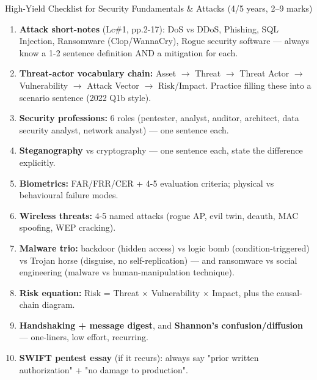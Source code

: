 \documentclass[12pt,a4paper]{article}
\begin{document}
\begin{keybox}{High-Yield Checklist for Security Fundamentals \& Attacks (4/5 years, 2--9 marks)}
\begin{enumerate}[noitemsep]
  \item \textbf{Attack short-notes} (Lc\#1, pp.2-17): DoS vs DDoS, Phishing, SQL Injection, Ransomware (Clop/WannaCry), Rogue security software --- always know a 1-2 sentence definition AND a mitigation for each.
  \item \textbf{Threat-actor vocabulary chain:} Asset $\to$ Threat $\to$ Threat Actor $\to$ Vulnerability $\to$ Attack Vector $\to$ Risk/Impact. Practice filling these into a scenario sentence (2022 Q1b style).
  \item \textbf{Security professions:} 6 roles (pentester, analyst, auditor, architect, data security analyst, network analyst) --- one sentence each.
  \item \textbf{Steganography} vs cryptography --- one sentence each, state the difference explicitly.
  \item \textbf{Biometrics:} FAR/FRR/CER + 4-5 evaluation criteria; physical vs behavioural failure modes.
  \item \textbf{Wireless threats:} 4-5 named attacks (rogue AP, evil twin, deauth, MAC spoofing, WEP cracking).
  \item \textbf{Malware trio:} backdoor (hidden access) vs logic bomb (condition-triggered) vs Trojan horse (disguise, no self-replication) --- and ransomware vs social engineering (malware vs human-manipulation technique).
  \item \textbf{Risk equation:} Risk = Threat $\times$ Vulnerability $\times$ Impact, plus the causal-chain diagram.
  \item \textbf{Handshaking + message digest}, and \textbf{Shannon's confusion/diffusion} --- one-liners, low effort, recurring.
  \item \textbf{SWIFT pentest essay} (if it recurs): always say "prior written authorization" + "no damage to production".
\end{enumerate}
\end{keybox}
\end{document}

